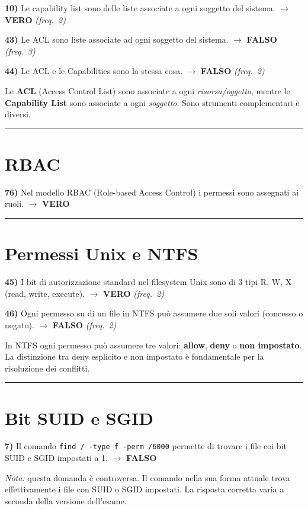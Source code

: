\documentclass[12pt, a4paper]{report}
\newcommand{\vero}{\textcolor{verdeanswer}{\textbf{VERO}}}
\newcommand{\falso}{\textcolor{rossoanswer}{\textbf{FALSO}}}
\newcommand{\freq}[1]{\textcolor{freqcolor}{\textit{(freq.\ #1)}}}
\begin{document}
\noindent\textbf{10)} Le capability list sono delle liste associate a ogni soggetto del sistema. $\to$ \vero{} \freq{2}

\medskip
\noindent\textbf{43)} Le ACL sono liste associate ad ogni soggetto del sistema. $\to$ \falso{} \freq{3}

\medskip
\noindent\textbf{44)} Le ACL e le Capabilities sono la stessa cosa. $\to$ \falso{} \freq{2}

\medskip
\noindent Le \textbf{ACL} (Access Control List) sono associate a ogni \textit{risorsa/oggetto}, mentre le \textbf{Capability List} sono associate a ogni \textit{soggetto}. Sono strumenti complementari e diversi.

\noindent\rule{\textwidth}{0.4pt}

\section{RBAC}

\noindent\textbf{76)} Nel modello RBAC (Role-based Access Control) i permessi sono assegnati ai ruoli. $\to$ \vero{}

\noindent\rule{\textwidth}{0.4pt}

\section{Permessi Unix e NTFS}

\noindent\textbf{45)} I bit di autorizzazione standard nel filesystem Unix sono di 3 tipi R, W, X (read, write, execute). $\to$ \vero{} \freq{2}

\medskip
\noindent\textbf{46)} Ogni permesso su di un file in NTFS può assumere due soli valori (concesso o negato). $\to$ \falso{} \freq{2}

\medskip
\noindent In NTFS ogni permesso può assumere tre valori: \textbf{allow}, \textbf{deny} o \textbf{non impostato}. La distinzione tra deny esplicito e non impostato è fondamentale per la risoluzione dei conflitti.

\noindent\rule{\textwidth}{0.4pt}

\section{Bit SUID e SGID}

\noindent\textbf{7)} Il comando \texttt{find / -type f -perm /6000} permette di trovare i file coi bit SUID e SGID impostati a 1. $\to$ \falso{}

\medskip
\noindent\textit{Nota:} questa domanda è controversa. Il comando nella sua forma attuale trova effettivamente i file con SUID o SGID impostati. La risposta corretta varia a seconda della versione dell'esame.
\end{document}
